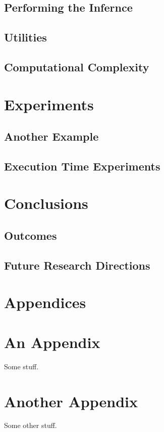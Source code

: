 \documentclass[11pt,twoside]{article}
\numberwithin{Theorem}{section}
\numberwithin{Definition}{section}
\numberwithin{Lemma}{section}
\numberwithin{Algorithm}{section}
\numberwithin{equation}{section}
\begin{document}
\subsection{Performing the Infernce}

\subsection{Utilities}

\subsection{Computational Complexity}

\clearpage
\section{Experiments}

\subsection{Another Example}

\subsection{Execution Time Experiments}

\section{Conclusions}

\subsection{Outcomes}

\subsection{Future Research Directions}
\clearpage

\printbibliography
\clearpage

\appendix
\section*{Appendices}

\clearpage
\section{An Appendix}
\label{app:one}

Some stuff.
\clearpage

\section{Another Appendix}
\label{app:two}

Some other stuff.
\end{document}
